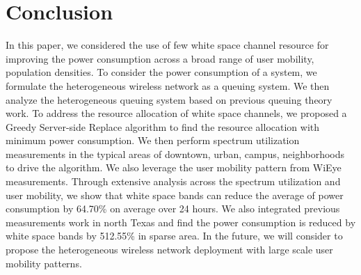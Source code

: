 \section{Conclusion}
\label{sec:conclusion}
In this paper, we considered the use of few white space channel resource 
for improving the power consumption across a broad range of user mobility, 
population densities. To consider the power consumption of a system, we 
formulate the heterogeneous wireless network as a queuing system. 
We then analyze the heterogeneous queuing system based on previous queuing 
theory work. To address the resource allocation of white space channels, 
we proposed a Greedy Server-side Replace algorithm to find the resource allocation 
with minimum power consumption. We then perform spectrum utilization 
measurements in the typical areas of downtown, urban, campus, neighborhoods 
to drive the algorithm. We also leverage the user mobility pattern from WiEye 
measurements. Through extensive analysis across the spectrum utilization 
and user mobility, we show that white space bands can reduce the average of 
power consumption by 64.70\% on average over 24 hours. We also integrated previous 
measurements work in north Texas and find the power consumption is reduced by white space
bands by 512.55\% in sparse area.
In the future, we will consider to propose the heterogeneous wireless network 
deployment with large scale user mobility patterns.

